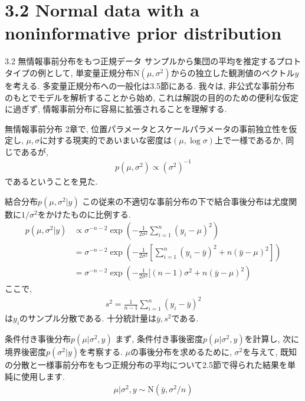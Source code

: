 \documentclass[10pt,dvipdfmx,a4]{beamer}
\newcommand{\eq}[1]{\begin{align}#1\end{align}}
\newcommand{\eqn}[1]{\begin{align*}#1\end{align*}}
\begin{document}
\section{3.2 Normal data with a noninformative prior distribution}
\begin{frame}{3.2 無情報事前分布をもつ正規データ}
サンプルから集団の平均を推定するプロトタイプの例として, 単変量正規分布$\text{N}(\mu,\sigma^2)$からの独立した観測値のベクトル$y$を考える.
多変量正規分布への一般化は3.5節にある.
我々は, 非公式な事前分布のもとでモデルを解析することから始め, これは解説の目的のための便利な仮定に過ぎず, 情報事前分布に容易に拡張されることを理解する.
\end{frame}


\begin{frame}{無情報事前分布}
2章で, 位置パラメータとスケールパラメータの事前独立性を仮定し, $\mu, \sigma$に対する現実的であいまいな密度は$(\mu, \log \sigma)$上で一様であるか, 同じであるが,
\eqn{p(\mu,\sigma^2)\propto (\sigma^2)^{-1}}
であるということを見た.
\end{frame}


\begin{frame}{結合分布$p(\mu,\sigma^2|y)$}
この従来の不適切な事前分布の下で結合事後分布は尤度関数に$1/\sigma^2$をかけたものに比例する.
\eq{p(\mu,\sigma^2|y)&\propto\sigma^{-n-2}\exp\left(-\frac{1}{2\sigma^2}\sum_{i=1}^n(y_i-\mu)^2\right)\nonumber\\
&=\sigma^{-n-2}\exp\left(-\frac{1}{2\sigma^2} \left[ \sum_{i=1}^n(y_i-\bar{y})^2+n(\bar{y}-\mu)^2 \right]\right)\nonumber\\
&=\sigma^{-n-2}\exp\left(-\frac{1}{2\sigma^2}[(n-1)\sigma^2+n(\bar{y}-\mu)^2\right)}
ここで, 
\eqn{s^2=\frac{1}{n-1}\sum_{i=1}^n(y_i-\bar{y})^2}
は$y_i$のサンプル分散である.
十分統計量は$\bar{y}, s^2$である.
\end{frame}


\begin{frame}{条件付き事後分布$p(\mu|\sigma^2,y)$}
まず, 条件付き事後密度$p(\mu|\sigma^2,y)$を計算し, 次に境界後密度$p(\sigma^2|y)$を考察する.
$\mu$の事後分布を求めるために, $\sigma^2$を与えて, 既知の分散と一様事前分布をもつ正規分布の平均について2.5節で得られた結果を単純に使用します.
\eq{\mu|\sigma^2, y\sim\text{N}(\bar{y},\sigma^2/n)}
\end{frame}
\end{document}
